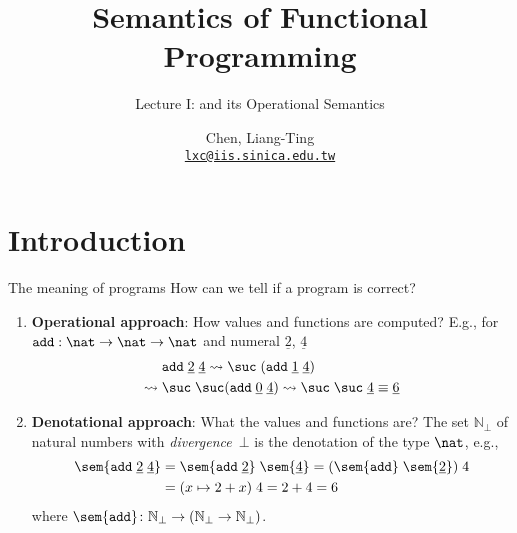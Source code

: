 \title{Semantics of Functional Programming}
\subtitle{Lecture I: \PCF{} and its Operational Semantics}
\author[L.-T. Chen]{Chen, Liang-Ting\\
  \href{mailto:lxc@iis.sinica.edu.tw}{\texttt{lxc@iis.sinica.edu.tw}}}


\setcounter{framenumber}{-1}

\frame{\maketitle}
\section{Introduction}

\begin{frame}{The meaning of programs}
  How can we tell if a program is correct? 
\end{frame}
\begin{frame}
  \begin{enumerate}
    \item \textbf{Operational approach}: How values and functions are computed?
      E.g., for $\mathtt{add}:\nat \to \nat \to\nat$ and numeral
      $\underline{2}$, $\underline{4}$
      \begin{align*}
        & \mathtt{add}\;\underline{2}\;\underline{4}
        \leadsto \suc\;(\mathtt{add}\; \underline{1}\;\underline{4}) \\
        \leadsto{} & \suc\;\suc(\mathtt{add}\; \underline{0}\;\underline{4})
        \leadsto \suc\;\suc\;\underline{4} \equiv
        \underline{6}
      \end{align*}
    \item \textbf{Denotational approach}: What the values and functions are?
      The set $\mathbb{N}_\bot$ of natural numbers with
      \emph{divergence}~$\bot$ is the denotation of the type $\nat$, e.g., 
      \begin{align*}
        \sem{\mathtt{add}\;\underline{2}\;\underline{4}} 
        & = \sem{\mathtt{add}\;\underline{2}}\;\sem{\underline{4}} 
        = (\sem{\mathtt{add}}\;\sem{\underline{2}}) \;4  \\
        & = (x \mapsto 2 + x)\;4 
        = 2 + 4 = 6
      \end{align*}
      where $\sem{\mathtt{add}}\colon \mathbb{N}_\bot \to (\mathbb{N}_\bot \to
      \mathbb{N}_\bot)$. 
  \end{enumerate}
\end{frame}

